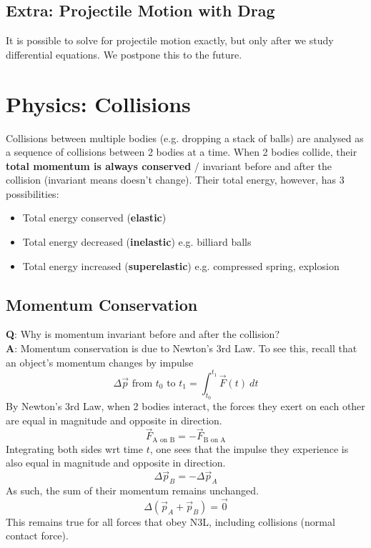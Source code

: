 \documentclass{article}
\begin{document}
\subsection{Extra: Projectile Motion with Drag}
It is possible to solve for projectile motion exactly, but only after we study differential equations. We postpone this to the future.

\section{Physics: Collisions}
Collisions between multiple bodies (e.g. dropping a stack of balls) are analysed as a sequence of collisions between 2 bodies at a time. When 2 bodies collide, their \textbf{total momentum is always conserved} / invariant before and after the collision (invariant means doesn't change). Their total energy, however, has 3 possibilities:
\begin{itemize}
    \item Total energy conserved (\textbf{elastic})
    \item Total energy decreased (\textbf{inelastic}) e.g. billiard balls
    \item Total energy increased (\textbf{superelastic}) e.g. compressed spring, explosion
\end{itemize}
\subsection{Momentum Conservation}
\textbf{Q}: Why is momentum invariant before and after the collision? \\[10pt]
\textbf{A}: Momentum conservation is due to Newton's 3rd Law. To see this, recall that an object's momentum changes by impulse 
$$\Delta \vec{p} \text{ from } t_0 \text{ to } t_1 = \int_{t_0}^{t_1} \vec{F}(t)\ dt$$
By Newton's 3rd Law, when 2 bodies interact, the forces they exert on each other are equal in magnitude and opposite in direction. 
$$\vec{F}_{\text{A on B}} = -\vec{F}_{\text{B on A}}$$
Integrating both sides wrt time $t$, one sees that the impulse they experience is also equal in magnitude and opposite in direction.
$$\Delta \vec{p}_B = - \Delta \vec{p}_A$$
As such, the sum of their momentum remains unchanged.
$$\Delta(\vec{p}_A + \vec{p}_B) = \vec{0}$$
This remains true for all forces that obey N3L, including collisions (normal contact force). 
\end{document}
